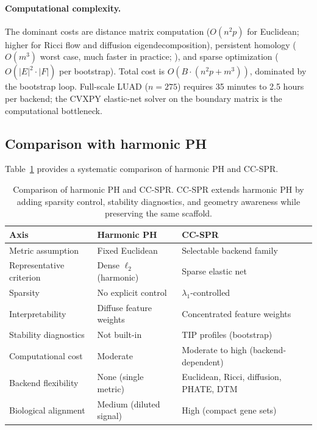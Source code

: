 \documentclass[12pt]{article}
\begin{document}
\paragraph{Computational complexity.}
The dominant costs are distance matrix computation ($O(n^2 p)$ for Euclidean; higher for Ricci flow and diffusion eigendecomposition), persistent homology ($O(m^3)$ worst case, much faster in practice; \citealt{gudhi2014}), and sparse optimization ($O(|E|^2 \cdot |F|)$ per bootstrap).
Total cost is $O(B \cdot (n^2 p + m^3))$, dominated by the bootstrap loop.
Full-scale LUAD ($n = 275$) requires 35 minutes to 2.5 hours per backend; the CVXPY elastic-net solver on the boundary matrix is the computational bottleneck.

\subsection{Comparison with harmonic PH}
\label{sec:comparison}

Table~\ref{tab:hphcompare} provides a systematic comparison of harmonic PH and CC-SPR.

\begin{table}[h]
\centering
\small
\begin{tabular}{p{2.5cm}p{3.0cm}p{3.0cm}}
\toprule
\textbf{Axis} & \textbf{Harmonic PH} & \textbf{CC-SPR} \\
\midrule
Metric assumption & Fixed Euclidean & Selectable backend family \\
Representative criterion & Dense $\ell_2$ (harmonic) & Sparse elastic net \\
Sparsity & No explicit control & $\lambda_1$-controlled \\
Interpretability & Diffuse feature weights & Concentrated feature weights \\
Stability diagnostics & Not built-in & TIP profiles (bootstrap) \\
Computational cost & Moderate & Moderate to high (backend-dependent) \\
Backend flexibility & None (single metric) & Euclidean, Ricci, diffusion, PHATE, DTM \\
Biological alignment & Medium (diluted signal) & High (compact gene sets) \\
\bottomrule
\end{tabular}
\caption{Comparison of harmonic PH and CC-SPR. CC-SPR extends harmonic PH by adding sparsity control, stability diagnostics, and geometry awareness while preserving the same scaffold.}
\label{tab:hphcompare}
\end{table}
\end{document}
